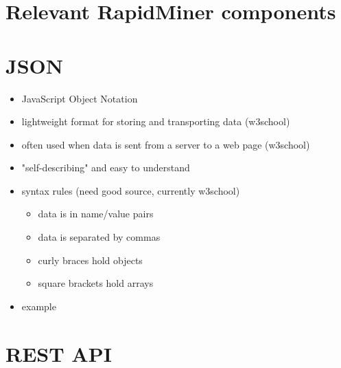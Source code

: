 
\section{Relevant RapidMiner components}


\section{JSON}

\begin{itemize}
	\item JavaScript Object Notation
	\item lightweight format for storing and transporting data (w3school)
	\item often used when data is sent from a server to a web page (w3school)
	\item "self-describing" and easy to understand
	\item syntax rules (need good source, currently w3school)
	\begin{itemize}
		\item data is in name/value pairs
		\item data is separated by commas
		\item curly braces hold objects
		\item square brackets hold arrays
	\end{itemize}
	\item example
\end{itemize}


\section{REST API}
